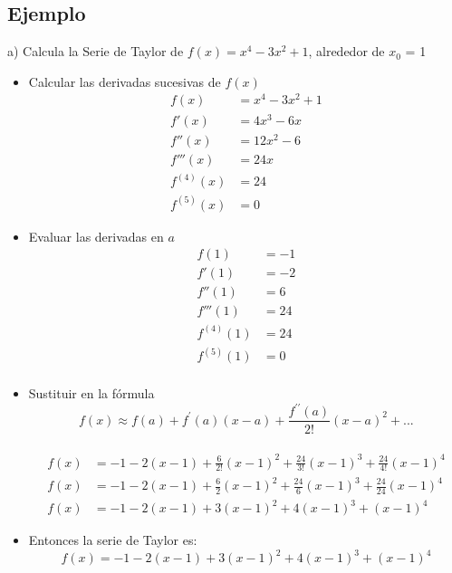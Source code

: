 \documentclass[12pt, a4paper, oneside]{article}
\begin{document}
\subsection{Ejemplo}
a) Calcula la Serie de Taylor de $f(x)=x^4-3x^2+1$, alrededor de $x_0$ = 1
\begin{itemize}
  \item Calcular las derivadas sucesivas de $f(x)$
    \begingroup
    \Large
    \begin{align*}
      f(x) &= x^4 - 3x^2 + 1\\
      f'(x) &= 4x^3-6x \\
      f''(x) &= 12x^2-6\\
      f'''(x) &= 24x\\
      f^{(4)}(x) &= 24\\
      f^{(5)}(x) &= 0
    \end{align*}
    \endgroup

  \item Evaluar las derivadas en $a$
    \begingroup
    \Large
    \begin{align*}
      f(1) &= -1\\
      f'(1) &= -2\\
      f''(1) &= 6\\
      f'''(1) &= 24\\
      f^{(4)}(1) &= 24\\
      f^{(5)}(1) &= 0\\
    \end{align*}
    \endgroup

  \item Sustituir en la fórmula
    \begingroup
    \Large
    \begin{equation*}
      f(x) \approx f(a) + f^\prime(a)(x-a) + \frac{f^{\prime\prime}(a)}{2!}(x-a)^2 + ...
    \end{equation*}\\ 
    \large
    \begin{align*}
      f(x) &= -1-2(x-1) + \frac{6}{2!}(x-1)^2 +\frac{24}{3!}(x-1)^3+ 
      \frac{24}{4!}(x-1)^4 \\
      f(x) &= -1-2(x-1)+\frac{6}{2}(x-1)^2 +\frac{24}{6}(x-1)^3+ \frac{24}{24}(x-1)^4 \\ 
      f(x) &= -1-2(x-1)+3(x-1)^2+4(x-1)^3+(x-1)^4
    \end{align*}
    \endgroup 

  \item Entonces la serie de Taylor es:
    \begingroup
    \Large
    \begin{equation*}
      f(x) = -1-2(x-1)+3(x-1)^2+4(x-1)^3+(x-1)^4
    \end{equation*}
    \endgroup

\end{itemize}
\end{document}
